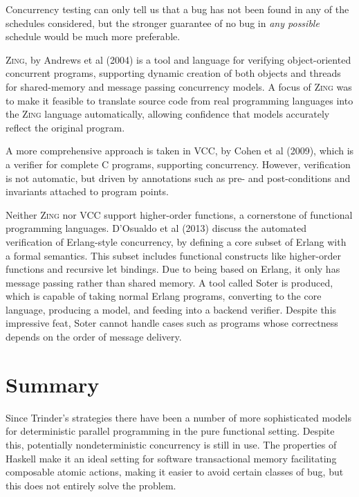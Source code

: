 Concurrency testing can only tell us that a bug has not been found in
any of the schedules considered, but the stronger guarantee of no bug
in \textit{any possible} schedule would be much more preferable.

\textsc{Zing}, by Andrews et al (2004)\nocite{zing} is a tool and
language for verifying object-oriented concurrent programs, supporting
dynamic creation of both objects and threads for shared-memory and
message passing concurrency models. A focus of \textsc{Zing} was to
make it feasible to translate source code from real programming
languages into the \textsc{Zing} language automatically, allowing
confidence that models accurately reflect the original program.

A more comprehensive approach is taken in VCC, by Cohen et al
(2009)\nocite{vcc}, which is a verifier for complete C programs,
supporting concurrency. However, verification is not automatic, but
driven by annotations such as pre- and post-conditions and invariants
attached to program points.

Neither \textsc{Zing} nor VCC support higher-order functions, a
cornerstone of functional programming languages. D'Osualdo et al
(2013)\nocite{erlang} discuss the automated verification of
Erlang-style concurrency, by defining a core subset of Erlang with a
formal semantics. This subset includes functional constructs like
higher-order functions and recursive let bindings. Due to being based
on Erlang, it only has message passing rather than shared memory. A
tool called Soter is produced, which is capable of taking normal
Erlang programs, converting to the core language, producing a model,
and feeding into a backend verifier. Despite this impressive feat,
Soter cannot handle cases such as programs whose correctness depends
on the order of message delivery.

\section{Summary}
\label{sec:litrev-summary}

Since Trinder's strategies there have been a number of more
sophisticated models for deterministic parallel programming in the
pure functional setting. Despite this, potentially nondeterministic
concurrency is still in use. The properties of Haskell make it an
ideal setting for software transactional memory facilitating
composable atomic actions, making it easier to avoid certain classes
of bug, but this does not entirely solve the problem.

